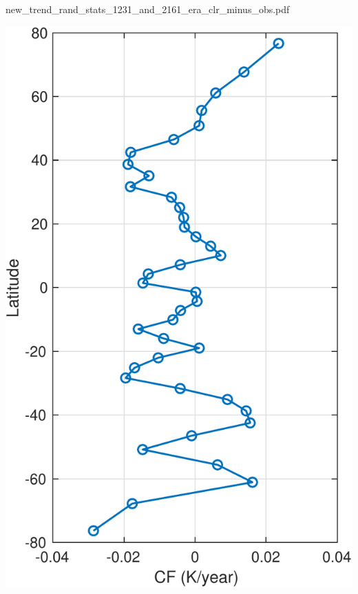 \documentclass[presentation]{beamer}
\begin{document}
\begin{frame}[label={sec:org47ea8d3}]{new\_trend\_rand\_stats\_1231\_and\_2161\_era\_clr\_minus\_obs.pdf}
\begin{center}
\includegraphics[width=0.7\linewidth]{./Figs/Pdf/new_trend_rand_stats_1231_and_2161_era_clr_minus_obs.pdf}
\end{center}
\end{frame}
\end{document}

